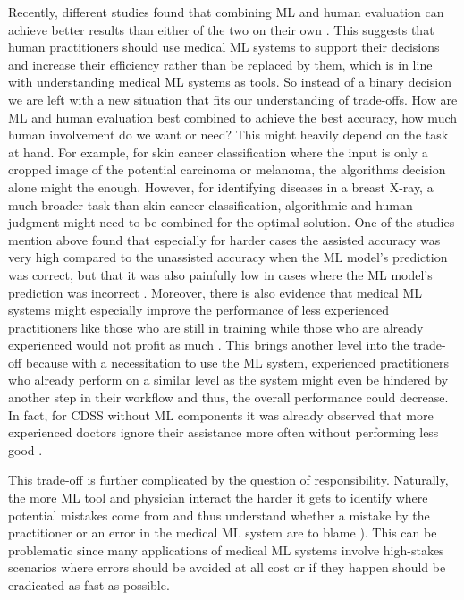 Recently, different studies found that combining ML and human evaluation can achieve better results than either of the two on their own \cite{rajpurkar2022ai, kiani2020impact, topol2019high, steiner2018impact}. This suggests that human practitioners should use medical ML systems to support their decisions and increase their efficiency rather than be replaced by them, which is in line with understanding medical ML systems as tools. So instead of a binary decision we are left with a new situation that fits our understanding of trade-offs. How are ML and human evaluation best combined to achieve the best accuracy, how much human involvement do we want or need? This might heavily depend on the task at hand. For example, for skin cancer classification where the input is only a cropped image of the potential carcinoma or melanoma, the algorithms decision alone might the enough. However, for identifying diseases in a breast X-ray, a much broader task than skin cancer classification, algorithmic and human judgment might need to be combined for the optimal solution.  One of the studies mention above found that especially for harder cases the assisted accuracy was very high compared to the unassisted accuracy when the ML model's prediction was correct, but that it was also painfully low in cases where the ML model's prediction was incorrect \cite{kiani2020impact}. Moreover, there is also evidence that medical ML systems might especially improve the performance of less experienced practitioners like those who are still in training while those who are already experienced would not profit as much \cite{rajpurkar2022ai}. This brings another level into the trade-off because with a necessitation to use the ML system, experienced practitioners who already perform on a similar level as the system might even be hindered by another step in their workflow and thus, the overall performance could decrease. In fact, for CDSS without ML components it was already observed that more experienced doctors ignore their assistance more often without performing less good \cite{sutton2020overview}.

This trade-off is further complicated by the question of responsibility. Naturally, the more ML tool and physician interact the harder it gets to identify where potential mistakes come from and thus understand whether a mistake by the practitioner or an error in the medical ML system are to blame \cite{horgan2019artificial}). This can be problematic since many applications of medical ML systems involve high-stakes scenarios where errors should be avoided at all cost or if they happen should be eradicated as fast as possible.

